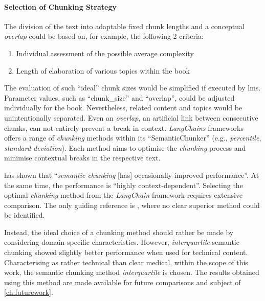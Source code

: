     \paragraph{Selection of Chunking Strategy}
        The division of the text into adaptable fixed chunk lengths and a conceptual \textit{overlap} could be based on, for example, the following 2 criteria:
        \begin{enumerate}
            \item Individual assessment of the possible average complexity
            \item Length of elaboration of various topics within the book
        \end{enumerate}
        The evaluation of such \enquote{ideal} chunk sizes would be simplified if executed by \acp{lm}.
        Parameter values, such as \enquote{chunk\_size} and \enquote{overlap}, could be adjusted individually for the book.
        Nevertheless, related content and topics would be unintentionally separated.
        Even an \textit{overlap}, an artificial link between consecutive chunks, can not entirely prevent a break in context.
        \textit{LangChains} frameworks offers a range of \textit{chunking} methods within its \enquote{SemanticChunker} (e.g., \textit{percentile}, \textit{standard deviation}).
        Each method aims to optimise the \textit{chunking} process and minimise contextual breaks in the respective text.

        \citet{qu2025semantic_chunking} has shown that \enquote{\textit{semantic chunking} [has] occasionally improved performance}.
        At the same time, the performance is \enquote{highly context-dependent}.
        Selecting the optimal \textit{chunking} method from the \textit{LangChain} framework requires extensive comparison.
        The only guiding reference is \citet{langchainsemantic2024comparison}, where no clear superior method could be identified.
        
        Instead, the ideal choice of a chunking method should rather be made by considering domain-specific characteristics.
        However, \textit{interquartile} semantic chunking showed slightly better performance when used for technical content.
        Characterising \citet{bb2} as rather technical than clear medical, within the scope of this work, the semantic chunking method \textit{interquartile} is chosen.
        The results obtained using this method are made available for future comparisons and subject of \cref{ch:futurework}.

